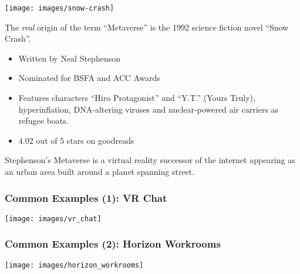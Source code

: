 \documentclass[aspectratio=169,x11names]{beamer}
\def\Put(#1,#2)#3{\leavevmode\makebox(0,0){\put(#1,#2){#3}}}
\begin{document}
\begin{frame}
\begin{minipage}{0.45\textwidth}
\begin{center}
\texttt{[image: images/snow-crash]} 
\end{center}
\end{minipage}%
\begin{minipage}{0.55\textwidth}
The \emph{real} origin of the term ``Metaverse'' is the 1992 science fiction novel ``Snow Crash''.
\begin{center}
\begin{itemize}
\item Written by Neal Stephenson
\item Nominated for BSFA and ACC Awards
\item Features characters ``Hiro Protagonist'' and ``Y.T.'' (Yours Truly), hyperinflation, DNA-altering viruses and nuclear-powered air carriers as refugee boats. 
\item $4.02$ out of $5$ stars on goodreads
\end{itemize}
\end{center}

Stephenson's Metaverse is a virtual reality successor of the internet appearing as an urban area built around a planet spanning street.
\end{minipage}
\end{frame}

\begin{frame}
\frametitle{Common Examples (1): VR Chat}
\begin{center}
\texttt{[image: images/vr\_chat]} 
\end{center}
\end{frame}

\begin{frame}
\frametitle{Common Examples (2): Horizon Workrooms}
\begin{center}
\texttt{[image: images/horizon\_workrooms]} 
\end{center}
\end{frame}

\end{document}
